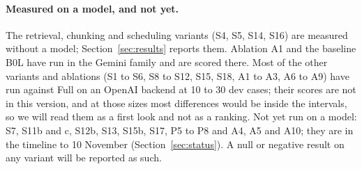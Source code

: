 \paragraph{Measured on a model, and not yet.} The retrieval, chunking and scheduling variants (S4, S5, S14, S16) are measured without a model; Section~\ref{sec:results} reports them. Ablation A1 and the baseline B0L have run in the Gemini family and are scored there. Most of the other variants and ablations (S1 to S6, S8 to S12, S15, S18, A1 to A3, A6 to A9) have run against Full on an OpenAI backend at 10 to 30 dev cases; their scores are not in this version, and at those sizes most differences would be inside the intervals, so we will read them as a first look and not as a ranking. Not yet run on a model: S7, S11b and c, S12b, S13, S15b, S17, P5 to P8 and A4, A5 and A10; they are in the timeline to 10 November (Section~\ref{sec:status}). A null or negative result on any variant will be reported as such.
